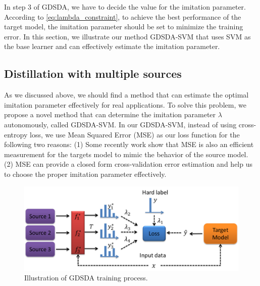 In step 3 of GDSDA, we have to decide the value for the imitation parameter. According to \eqref{eq:lambda_constraint}, to achieve the best performance of the target model, the imitation parameter should be set to minimize the training error. In this section, we illustrate our method GDSDA-SVM that uses SVM as the base learner and can effectively estimate the imitation parameter.
\subsection{Distillation with multiple sources}
As we discussed above, we should find a method that can estimate the optimal imitation parameter effectively for real applications. 
To solve this problem, we propose a novel method that can determine the imitation parameter $\lambda$ autonomously, called GDSDA-SVM. In our GDSDA-SVM, instead of using cross-entropy loss, we use Mean Squared Error (MSE) as our loss function for the following two reasons: (1) Some recently work \cite{ba2014deep,luo2016face,romero2014fitnets,urban2016deep} show that MSE is also an efficient measurement for the targets model to mimic the behavior of the source model. (2) MSE can provide a closed form cross-validation error estimation and help us to choose the proper imitation parameter effectively. 

\begin{figure}
\centering
\includegraphics[scale=.4]{figure/multi-GDDA.png}
\caption{Illustration of GDSDA training process.}
\end{figure}

